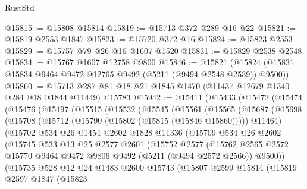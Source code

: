 \begin{lexlean}{RustStd}
\begin{coremodule}
@15815 := @15808 @15814
@15819 := @15713 @372 @289 @16 @22
@15821 := @15819 @2553 @1847
@15823 := @15720 @372 @16
@15824 := @15823 @2553
@15829 := @15757 @79 @26 @16 @1607 @1520
@15831 := @15829 @2538 @2548
@15834 := @15767 @1607 @12758 @9800
@15846 := @15821 (@15824 (@15831 @15834 @9464 @9472 @12765 @9492 (@5211 (@9494 @2548 @2539)) @9500))
@15860 := @15713 @287 @81 @18 @21 @1845 @1470 (@11437 @12679 @1340 @284 @18 @1844 @11449) @15783
@15942 := @15411
    (@15433
      (@15472
        (@15474
          (@15476
            (@15497
              (@15515
                (@15532
                  (@15545
                    (@15561
                      (@15565
                        (@15687
                          (@15698
                            (@15708 (@15712 (@15790 (@15802 (@15815 (@15846 @15860))))) @11464)
                            (@15702
                              @534
                              @26
                              @1454
                              @2602
                              @1828
                              @11336
                              (@15709
                                @534
                                @26
                                @2602
                                (@15745
                                  @533
                                  @13
                                  @25
                                  @2577
                                  @2601
                                  (@15752
                                    @2577
                                    (@15762
                                      @2565
                                      @2572
                                      @15770
                                      @9464
                                      @9472
                                      @9806
                                      @9492
                                      (@5211 (@9494 @2572 @2566))
                                      @9500))
                                  (@15735
                                    @528
                                    @12
                                    @24
                                    @1483
                                    @2600
                                    @15743
                                    (@15807
                                      @2599
                                      @15814
                                      (@15819
                                        @2597
                                        @1847
                                        (@15823

\end{coremodule}
\end{lexlean}
